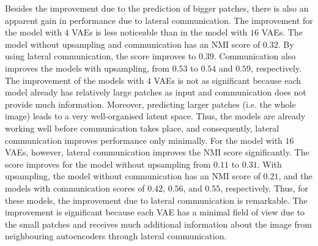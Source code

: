 Besides the improvement due to the prediction of bigger patches, there is also an apparent gain in performance due to lateral communication. The improvement for the model with $4$ VAEs is less noticeable than in the model with $16$ VAEs. The model without upsampling and communication has an NMI score of $0.32$. By using lateral communication, the score improves to $0.39$. Communication also improves the models with upsampling, from $0.53$ to $0.54$ and $0.59$, respectively. The improvement of the models with $4$ VAEs is not as significant because each model already has relatively large patches as input and communication does not provide much information. Moreover, predicting larger patches (i.e. the whole image) leads to a very well-organised latent space. Thus, the models are already working well before communication takes place, and consequently, lateral communication improves performance only minimally.
For the model with $16$ VAEs, however, lateral communication improves the NMI score significantly. The score improves for the model without upsampling from $0.11$ to $0.31$. With upsampling, the model without communication has an NMI score of $0.21$, and the models with communication scores of $0.42$, $0.56$, and $0.55$, respectively. Thus, for these models, the improvement due to lateral communication is remarkable. The improvement is significant because each VAE has a minimal field of view due to the small patches and receives much additional information about the image from neighbouring autoencoders through lateral communication.


